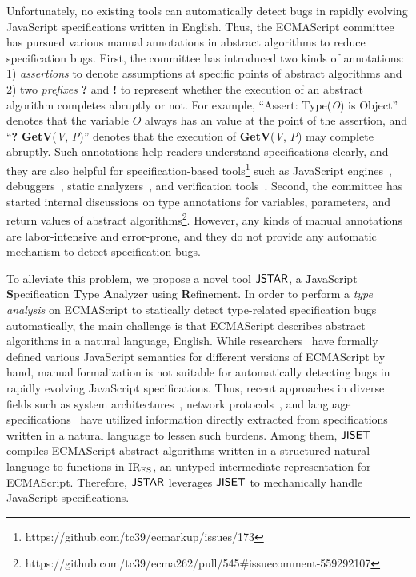 Unfortunately, no existing tools can automatically detect bugs in
rapidly evolving JavaScript specifications written in English. Thus,
the ECMAScript committee has pursued various manual annotations in
abstract algorithms to reduce specification bugs.
First, the committee has introduced two kinds of annotations: 1)
\textit{assertions} to denote assumptions at specific points of abstract
algorithms and 2) two \textit{prefixes} \textbf{?} and \textbf{!} to
represent whether the execution of an abstract algorithm completes
abruptly or not. For example, ``Assert: Type(\textit{O}) is Object'' denotes that
the variable $\textit{O}$ always has an  value at the
point of the assertion, and ``\textbf{?} \textbf{GetV}(\textit{V}, \textit{P})'' denotes that
the execution of \textbf{GetV}(\textit{V}, \textit{P}) may complete abruptly.
Such annotations help readers understand specifications clearly, and
they are also helpful for specification-based
tools\footnote{https://github.com/tc39/ecmarkup/issues/173} such as JavaScript
engines~\cite{v8, graaljs, qjs, moddable}, debuggers~\cite{jsexplain}, static
analyzers~\cite{safe, tajs, jsai, wala}, and verification tools~\cite{javert,
javert2}.
Second, the committee has started internal discussions on type
annotations for variables, parameters, and return values of abstract
algorithms\footnote{https://github.com/tc39/ecma262/pull/545\#issuecomment-559292107}.
However, any kinds of manual annotations are labor-intensive and
error-prone, and they do not provide any automatic mechanism to detect
specification bugs.

To alleviate this problem, we propose a novel tool $\tool$, a \textbf{J}avaScript
\textbf{S}pecification \textbf{T}ype \textbf{A}nalyzer using
\textbf{R}efinement. In order to perform a \textit{type analysis} on ECMAScript
to statically detect type-related specification bugs automatically,
the main challenge is that ECMAScript describes abstract algorithms in
a natural language, English. While researchers~\cite{lambdajs, jscert, kjs}
have formally defined various JavaScript semantics for different
versions of ECMAScript by hand, manual formalization is not suitable for
automatically detecting bugs in rapidly evolving JavaScript specifications. 
Thus, recent approaches in diverse fields such as system architectures~\cite{x86, arm},
network protocols~\cite{basespec}, and language specifications~\cite{spectest, javadoc}
have utilized information directly extracted from specifications written in a natural language
to lessen such burdens.
Among them, $\jiset$~\cite{jiset} compiles ECMAScript abstract algorithms written in
a structured natural language to functions in ${\text{IR}_\text{ES}}$, an untyped
intermediate representation for ECMAScript.
Therefore, $\tool$ leverages $\jiset$ to mechanically handle JavaScript specifications.


